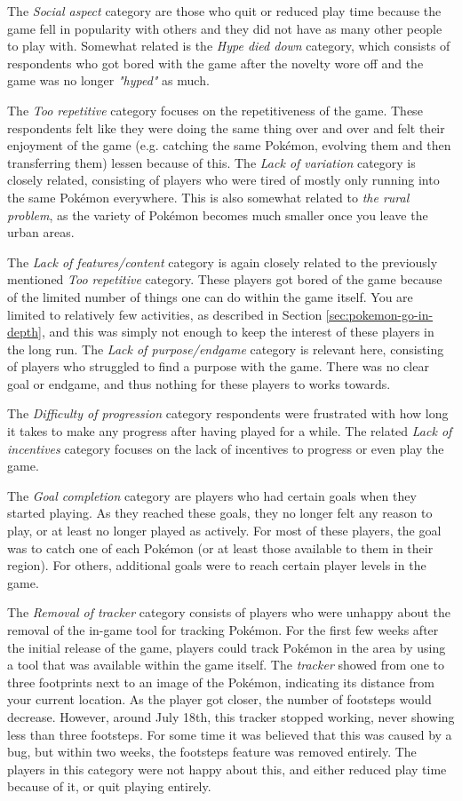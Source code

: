 The \emph{Social aspect} category are those who quit or reduced play time because the game fell in popularity with others and they did not have as many other people to play with. Somewhat related is the \emph{Hype died down} category, which consists of respondents who got bored with the game after the novelty wore off and the game was no longer \emph{"hyped"} as much.

The \emph{Too repetitive} category focuses on the repetitiveness of the game. These respondents felt like they were doing the same thing over and over and felt their enjoyment of the game (e.g. catching the same Pokémon, evolving them and then transferring them) lessen because of this. The \emph{Lack of variation} category is closely related, consisting of players who were tired of mostly only running into the same Pokémon everywhere. This is also somewhat related to \emph{the rural problem}, as the variety of Pokémon becomes much smaller once you leave the urban areas.

The \emph{Lack of features/content} category is again closely related to the previously mentioned \emph{Too repetitive} category. These players got bored of the game because of the limited number of things one can do within the game itself. You are limited to relatively few activities, as described in Section \ref{sec:pokemon-go-in-depth}, and this was simply not enough to keep the interest of these players in the long run. The \emph{Lack of purpose/endgame} category is relevant here, consisting of players who struggled to find a purpose with the game. There was no clear goal or endgame, and thus nothing for these players to works towards.

The \emph{Difficulty of progression} category respondents were frustrated with how long it takes to make any progress after having played for a while. The related \emph{Lack of incentives} category focuses on the lack of incentives to progress or even play the game.

The \emph{Goal completion} category are players who had certain goals when they started playing. As they reached these goals, they no longer felt any reason to play, or at least no longer played as actively. For most of these players, the goal was to catch one of each Pokémon (or at least those available to them in their region). For others, additional goals were to reach certain player levels in the game.

The \emph{Removal of tracker} category consists of players who were unhappy about the removal of the in-game tool for tracking Pokémon. For the first few weeks after the initial release of the game, players could track Pokémon in the area by using a tool that was available within the game itself. The \emph{tracker} showed from one to three footprints next to an image of the Pokémon, indicating its distance from your current location. As the player got closer, the number of footsteps would decrease. However, around July 18th, this tracker stopped working, never showing less than three footsteps. For some time it was believed that this was caused by a bug, but within two weeks, the footsteps feature was removed entirely. The players in this category were not happy about this, and either reduced play time because of it, or quit playing entirely.

